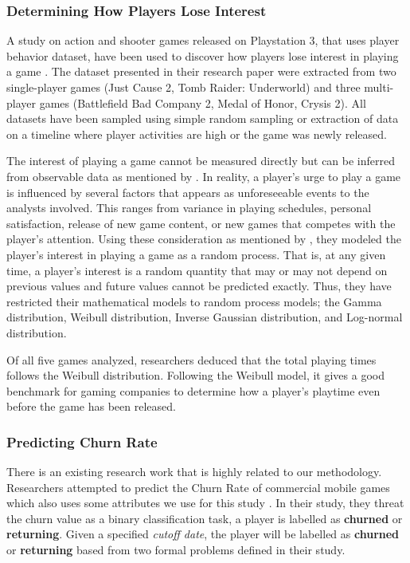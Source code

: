 \subsubsection{Determining How Players Lose Interest}
A study on action and shooter games released on Playstation 3, that uses player behavior dataset, have been used to discover how players lose interest in playing a game \cite{ref:how_players_lose_interest}. The dataset presented in their research paper were extracted from two single-player games (Just Cause 2, Tomb Raider: Underworld) and three multi-player games (Battlefield Bad Company 2, Medal of Honor, Crysis 2).  All datasets have been sampled using simple random sampling or extraction of data on a timeline where player activities are high or the game was newly released.

The interest of playing a game cannot be measured directly but can be inferred from observable data as mentioned by \cite{ref:how_players_lose_interest}. In reality, a player's urge to play a game is influenced by several factors that appears as unforeseeable events to the analysts involved. This ranges from variance in playing schedules, personal satisfaction, release of new game content, or new games that competes with the player's attention. Using these consideration as mentioned by \cite{ref:how_players_lose_interest}, they modeled the player's interest in playing a game as a random process. That is, at any given time, a player's interest is a random quantity that may or may not depend on previous values and future values cannot be predicted exactly. Thus, they have restricted their mathematical models to random process models; the Gamma distribution, Weibull distribution, Inverse Gaussian distribution, and Log-normal distribution.

Of all five games analyzed, researchers deduced that the total playing times follows the Weibull distribution. Following the Weibull model, it gives a good benchmark for gaming companies to determine how a player's playtime even before the game has been released.

\subsubsection{Predicting Churn Rate}
There is an existing research work that is highly related to our methodology. Researchers attempted to predict the Churn Rate of commercial mobile games which also uses some attributes we use for this study \cite{ref:predicting_player_churn}. In their study, they threat the churn value as a binary classification task, a player is labelled as \textbf{churned} or \textbf{returning}. Given a specified \textit{cutoff date}, the player will be labelled as \textbf{churned} or \textbf{returning} based from two formal problems defined in their study.

